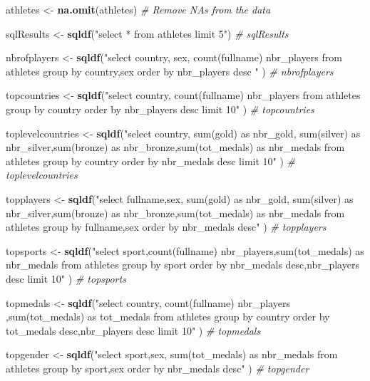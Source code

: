 \documentclass[]{article}
\newenvironment{Shaded}{\begin{snugshade}}{\end{snugshade}}
\newcommand{\CommentTok}[1]{\textcolor[rgb]{0.56,0.35,0.01}{\textit{#1}}}
\newcommand{\KeywordTok}[1]{\textcolor[rgb]{0.13,0.29,0.53}{\textbf{#1}}}
\newcommand{\NormalTok}[1]{#1}
\newcommand{\StringTok}[1]{\textcolor[rgb]{0.31,0.60,0.02}{#1}}
\begin{document}
\begin{Shaded}
\begin{Highlighting}[]
\NormalTok{    athletes <-}\StringTok{ }\KeywordTok{na.omit}\NormalTok{(athletes)  }\CommentTok{# Remove NAs from the data}
    
\NormalTok{    sqlResults <-}\StringTok{ }\KeywordTok{sqldf}\NormalTok{(}\StringTok{"select  * from athletes limit 5"}\NormalTok{)}
    \CommentTok{# sqlResults}
    
\NormalTok{    nbrofplayers <-}\StringTok{ }\KeywordTok{sqldf}\NormalTok{(}\StringTok{"select country, sex, count(fullname) nbr_players  from athletes group by country,sex order by nbr_players desc "}\NormalTok{  )}
    \CommentTok{# nbrofplayers}
    
\NormalTok{    topcountries <-}\StringTok{ }\KeywordTok{sqldf}\NormalTok{(}\StringTok{"select  country, count(fullname) nbr_players  from athletes group by country order by nbr_players desc limit 10"}\NormalTok{  )}
    \CommentTok{# topcountries}
    
    
\NormalTok{    toplevelcountries <-}\StringTok{ }\KeywordTok{sqldf}\NormalTok{(}\StringTok{"select country, sum(gold) as nbr_gold, sum(silver) as nbr_silver,sum(bronze)  as nbr_bronze,sum(tot_medals) as nbr_medals from athletes group by country order by nbr_medals desc limit 10"}\NormalTok{  )}
    \CommentTok{# toplevelcountries}
    
\NormalTok{    topplayers <-}\StringTok{ }\KeywordTok{sqldf}\NormalTok{(}\StringTok{"select fullname,sex, sum(gold) as nbr_gold, sum(silver) as nbr_silver,sum(bronze)  as nbr_bronze,sum(tot_medals) as nbr_medals from athletes group by fullname,sex order by nbr_medals desc"}\NormalTok{  )}
    \CommentTok{# topplayers}
    
\NormalTok{    topsports <-}\StringTok{ }\KeywordTok{sqldf}\NormalTok{(}\StringTok{"select sport,count(fullname) nbr_players,sum(tot_medals) as nbr_medals from athletes group by sport order by nbr_medals desc,nbr_players desc limit 10"}\NormalTok{  )}
    \CommentTok{# topsports}
    
\NormalTok{    topmedals <-}\StringTok{ }\KeywordTok{sqldf}\NormalTok{(}\StringTok{"select  country, count(fullname) nbr_players ,sum(tot_medals) as tot_medals from athletes group by country order by tot_medals desc,nbr_players desc limit 10"}\NormalTok{  )}
    \CommentTok{# topmedals}
    
\NormalTok{    topgender <-}\StringTok{ }\KeywordTok{sqldf}\NormalTok{(}\StringTok{"select sport,sex, sum(tot_medals) as nbr_medals from athletes group by sport,sex order by nbr_medals desc"}\NormalTok{  )}
    \CommentTok{# topgender}
\end{Highlighting}
\end{Shaded}
\end{document}
